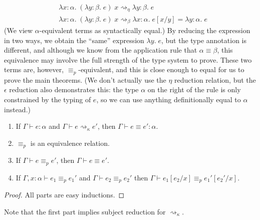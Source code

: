 \begin{align*}
&\lambda x:\alpha.\;(\lambda y:\beta.\;e)\;x\rightsquigarrow_\eta\lambda y:\beta.\;e\\
&\lambda x:\alpha.\;(\lambda y:\beta.\;e)\;x\rightsquigarrow_\beta\lambda x:\alpha.\;e[x/y]=\lambda y:\alpha.\;e
\end{align*}
(We view $\alpha$-equivalent terms as syntactically equal.) By reducing the expression in two ways, we obtain the ``same'' expression $\lambda y.\;e$, but the type annotation is different, and although we know from the application rule that $\alpha\equiv\beta$, this equivalence may involve the full strength of the type system to prove. These two terms are, however, $\equiv_p$-equivalent, and this is close enough to equal for us to prove the main theorems. (We don't actually use the $\eta$ reduction relation, but the $\epsilon$ reduction also demonstrates this: the type $\alpha$ on the right of the rule is only constrained by the typing of $e$, so we can use anything definitionally equal to $\alpha$ instead.)

\begin{lemma}
\begin{enumerate}
\item If $\Gamma\vdash e:\alpha$ and $\Gamma\vdash e\rightsquigarrow_\kappa e'$, then $\Gamma\vdash e\equiv e':\alpha$.
\item $\equiv_p$ is an equivalence relation.
\item If $\Gamma\vdash e\equiv_p e'$, then $\Gamma\vdash e\equiv e'$.
\item\label{p_subst} If $\Gamma,x:\alpha\vdash e_1\equiv_p e_1'$ and $\Gamma\vdash e_2\equiv_p e_2'$ then $\Gamma\vdash e_1[e_2/x]\equiv_p e_1'[e_2'/x]$.
\end{enumerate}
\end{lemma}
\begin{proof}
All parts are easy inductions.
\end{proof}
Note that the first part implies subject reduction for $\rightsquigarrow_\kappa$.

